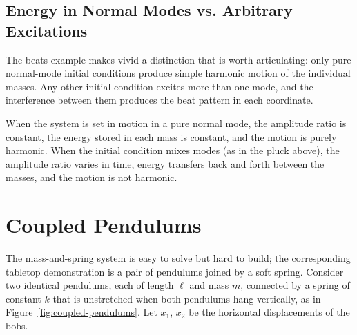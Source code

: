 \subsection{Energy in Normal Modes vs. Arbitrary Excitations}

The beats example makes vivid a distinction that is worth articulating: only pure normal-mode initial conditions produce simple harmonic motion of the individual masses. Any other initial condition excites more than one mode, and the interference between them produces the beat pattern in each coordinate.

\begin{fact}
When the system is set in motion in a pure normal mode, the amplitude ratio is constant, the energy stored in each mass is constant, and the motion is purely harmonic. When the initial condition mixes modes (as in the pluck above), the amplitude ratio varies in time, energy transfers back and forth between the masses, and the motion is not harmonic.
\end{fact}

\section{Coupled Pendulums}

The mass-and-spring system is easy to solve but hard to build; the corresponding tabletop demonstration is a pair of pendulums joined by a soft spring. Consider two identical pendulums, each of length $\ell$ and mass $m$, connected by a spring of constant $k$ that is unstretched when both pendulums hang vertically, as in Figure~\ref{fig:coupled-pendulums}. Let $x_1$, $x_2$ be the horizontal displacements of the bobs.

